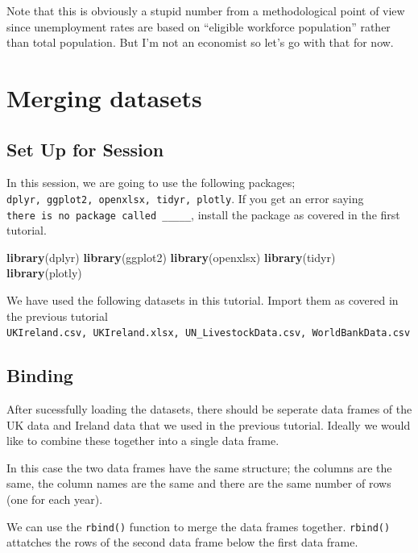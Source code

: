 \documentclass[]{book}
\newenvironment{Shaded}{\begin{snugshade}}{\end{snugshade}}
\newcommand{\KeywordTok}[1]{\textcolor[rgb]{0.13,0.29,0.53}{\textbf{#1}}}
\newcommand{\NormalTok}[1]{#1}
\begin{document}
Note that this is obviously a stupid number from a methodological point of view since unemployment rates are based on ``eligible workforce population'' rather than total population. But I'm not an economist so let's go with that for now.

\hypertarget{merging-datasets}{%
\chapter{Merging datasets}\label{merging-datasets}}

\hypertarget{set-up-for-session-1}{%
\section{Set Up for Session}\label{set-up-for-session-1}}

In this session, we are going to use the following packages; \texttt{dplyr,\ ggplot2,\ openxlsx,\ tidyr,\ plotly}. If you get an error saying \texttt{there\ is\ no\ package\ called\ \_\_\_\_\_}, install the package as covered in the first tutorial.

\begin{Shaded}
\begin{Highlighting}[]
\KeywordTok{library}\NormalTok{(dplyr)}
\KeywordTok{library}\NormalTok{(ggplot2)}
\KeywordTok{library}\NormalTok{(openxlsx)}
\KeywordTok{library}\NormalTok{(tidyr)}
\KeywordTok{library}\NormalTok{(plotly)}
\end{Highlighting}
\end{Shaded}

We have used the following datasets in this tutorial. Import them as covered in the previous tutorial \texttt{UKIreland.csv,\ UKIreland.xlsx,\ UN\_LivestockData.csv,\ WorldBankData.csv}

\hypertarget{binding}{%
\section{Binding}\label{binding}}

After sucessfully loading the datasets, there should be seperate data frames of the UK data and Ireland data that we used in the previous tutorial. Ideally we would like to combine these together into a single data frame.

In this case the two data frames have the same structure; the columns are the same, the column names are the same and there are the same number of rows (one for each year).

We can use the \texttt{rbind()} function to merge the data frames together. \texttt{rbind()} attatches the rows of the second data frame below the first data frame.
\end{document}
